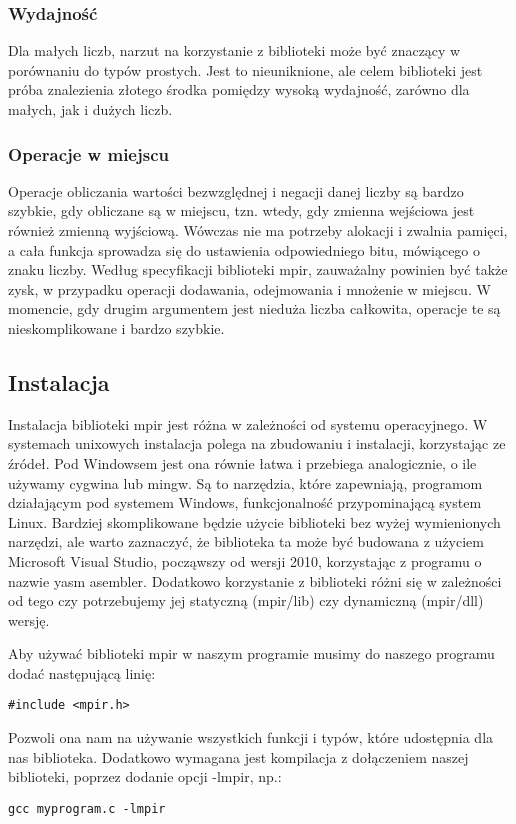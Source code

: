 \documentclass[twoside,a4paper]{book}
\begin{document}
\subsubsection{Wydajność}
Dla małych liczb, narzut na korzystanie z biblioteki może być znaczący w porównaniu do typów prostych. Jest to nieuniknione, ale celem biblioteki jest próba znalezienia złotego środka pomiędzy wysoką wydajność, zarówno dla małych, jak i dużych liczb. 

\subsubsection{Operacje w miejscu}
Operacje obliczania wartości bezwzględnej i negacji danej liczby są bardzo szybkie, gdy obliczane są w miejscu, tzn. wtedy, gdy zmienna wejściowa jest również zmienną wyjściową. Wówczas nie ma potrzeby alokacji i zwalnia pamięci, a cała funkcja sprowadza się do ustawienia odpowiedniego bitu, mówiącego o znaku liczby. Według specyfikacji biblioteki mpir, zauważalny powinien być także zysk, w przypadku operacji dodawania, odejmowania i mnożenie w miejscu. W momencie, gdy drugim argumentem jest nieduża liczba całkowita, operacje te są nieskomplikowane i bardzo szybkie.

\subsection{Instalacja}

Instalacja biblioteki mpir jest różna w zależności od systemu operacyjnego. W systemach unixowych instalacja polega na zbudowaniu i instalacji, korzystając ze źródeł. Pod Windowsem jest ona równie łatwa i przebiega analogicznie, o ile używamy cygwina lub mingw. Są to narzędzia, które zapewniają, programom działającym pod systemem Windows, funkcjonalność przypominającą system Linux. Bardziej skomplikowane będzie użycie biblioteki bez wyżej wymienionych narzędzi, ale warto zaznaczyć, że biblioteka ta może być budowana z użyciem Microsoft Visual Studio, począwszy od wersji 2010, korzystając z programu o nazwie yasm asembler. Dodatkowo korzystanie z biblioteki różni się w zależności od tego czy potrzebujemy jej statyczną (mpir/lib) czy dynamiczną (mpir/dll) wersję.

Aby używać biblioteki mpir w naszym programie musimy do naszego programu dodać następującą linię:
\begin{lstlisting}
#include <mpir.h>
\end{lstlisting}

Pozwoli ona nam na używanie wszystkich funkcji i typów, które udostępnia dla nas biblioteka. Dodatkowo wymagana jest kompilacja z dołączeniem naszej biblioteki, poprzez dodanie opcji -lmpir, np.:
\begin{lstlisting}
gcc myprogram.c -lmpir
\end{lstlisting}
\end{document}
